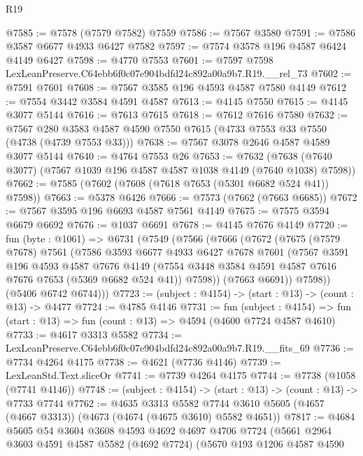 \begin{lexlean}{R19}
\begin{coremodule}
@7585 := @7578 (@7579 @7582) @7559
@7586 := @7567 @3580
@7591 := @7586 @3587 @6677 @4933 @6427 @7582
@7597 := @7574 @3578 @196 @4587 @6424 @4149 @6427
@7598 := @4770 @7553
@7601 := @7597 @7598 LexLeanPreserve.C64ebb6f0c07e904bdfd24c892a00a9b7.R19.__rel_73
@7602 := @7591 @7601
@7608 := @7567 @3585 @196 @4593 @4587 @7580 @4149
@7612 := @7554 @3442 @3584 @4591 @4587
@7613 := @4145 @7550
@7615 := @4145 @3077 @5144
@7616 := @7613 @7615
@7618 := @7612 @7616 @7580
@7632 := @7567 @280 @3583 @4587 @4590 @7550 @7615 (@4733 @7553 @33 @7550 (@4738 (@4739 @7553 @33)))
@7638 := @7567 @3078 @2646 @4587 @4589 @3077 @5144
@7640 := @4764 @7553 @26
@7653 := @7632 (@7638 (@7640 @3077) (@7567 @1039 @196 @4587 @4587 @1038 @4149 (@7640 @1038) @7598))
@7662 := @7585 (@7602 (@7608 (@7618 @7653 (@5301 @6682 @524 @41)) @7598))
@7663 := @5378 @6426
@7666 := @7573 (@7662 (@7663 @6685))
@7672 := @7567 @3595 @196 @6693 @4587 @7561 @4149
@7675 := @7575 @3594 @6679 @6692
@7676 := @1037 @6691
@7678 := @4145 @7676 @4149
@7720 := fun (byte : @1061) =>
  @6731
    (@7549
      (@7566
        (@7666
          (@7672
            (@7675
              (@7579 @7678)
              @7561
              (@7586
                @3593
                @6677
                @4933
                @6427
                @7678
                @7601
                (@7567
                  @3591
                  @196
                  @4593
                  @4587
                  @7676
                  @4149
                  (@7554 @3448 @3584 @4591 @4587 @7616 @7676 @7653 (@5369 @6682 @524 @41))
                  @7598))
              (@7663 @6691))
            @7598))
        (@5406 @6742 @6744)))
@7723 := (subject : @4154) -> (start : @13) -> (count : @13) -> @4477
@7724 := @4785 @4146
@7731 := fun (subject : @4154) =>
  fun (start : @13) => fun (count : @13) => @4594 (@4600 @7724 @4587 @4610)
@7733 := @4617 @3313 @5582
@7734 := LexLeanPreserve.C64ebb6f0c07e904bdfd24c892a00a9b7.R19.__fits_69
@7736 := @7734 @4264 @4175
@7738 := @4621 (@7736 @4146)
@7739 := LexLeanStd.Text.sliceOr
@7741 := @7739 @4264 @4175
@7744 := @7738 (@1058 (@7741 @4146))
@7748 := (subject : @4154) -> (start : @13) -> (count : @13) -> @7733 @7744
@7762 := @4635
    @3313
    @5582
    @7744
    @3610
    @5605
    (@4657 (@4667 @3313))
    (@4673 (@4674 (@4675 @3610) @5582 @4651))
@7817 := @4684
    @5605
    @54
    @3604
    @3608
    @4593
    @4692
    @4697
    @4706
    @7724
    (@5661
      @2964
      @3603
      @4591
      @4587
      @5582
      (@4692 @7724)
      (@5670
        @193
        @1206
        @4587
        @4590

\end{coremodule}
\end{lexlean}
